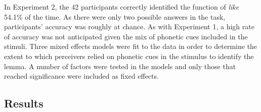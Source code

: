 \begin{table}[ht]
\begin{center}
\caption{Potential phonetic cues in stimuli from Experiment 2, by type and social group}\label{tab:cues2}
\end{center}
\end{table} 

In Experiment 2, the 42 participants correctly identified the function of \textit{like} 54.1\% of the time. As there were only two possible answers in the task, participants' accuracy was roughly at chance. As with Experiment 1, a high rate of accuracy was not anticipated given the mix of phonetic cues included in the stimuli. Three mixed effects models were fit to the data in order to determine the extent to which perceivers relied on phonetic cues in the stimulus to identify the lemma. A number of factors were tested in the models and only those that reached significance were included as fixed effects.

\subsection{Results}

